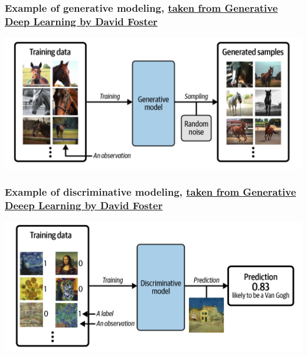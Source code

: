 \documentclass{beamer}
\begin{document}
\begin{frame}
\frametitle{Example of generative modeling, \href{{https://www.oreilly.com/library/view/generative-deep-learning/9781098134174/ch01.html}}{taken from Generative Deep Learning by David Foster}}

\vspace{6mm}

\centerline{\includegraphics[width=1.0\linewidth]{figures/generativelearning.png}}

\vspace{6mm}
\end{frame}

\begin{frame}
\frametitle{Example of discriminative modeling, \href{{https://www.oreilly.com/library/view/generative-deep-learning/9781098134174/ch01.html}}{taken from Generative Deeep Learning by David Foster}}

\vspace{6mm}

\centerline{\includegraphics[width=1.0\linewidth]{figures/standarddeeplearning.png}}

\vspace{6mm}
\end{frame}
\end{document}
